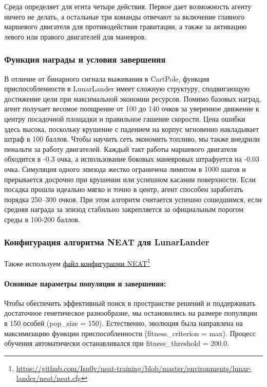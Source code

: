 Среда определяет для егнта четыре действия. Первое дает возможность агенту ничего не делать, а остальные три команды отвечают за включение главного маршевого двигателя для противодействия гравитации, а также за активацию левого или правого двигателей для маневров.

\subsubsection{Функция награды и условия завершения}

В отличие от бинарного сигнала выживания в CartPole, функция приспособленности в LunarLander имеет сложную структуру, сподвигающую достижение цели при максимальной экономии ресурсов. Помимо базовых наград, агент получает весомое поощрение от 100 до 140 очков за уверенное движение к центру посадочной площадки и правильное гашение скорости. Цена ошибки здесь высока, поскольку крушение с падением на корпус мгновенно накладывает штраф в 100 баллов. Чтобы научить сеть экономить топливо, мы также внедрили пенальти за работу двигателей. Каждый такт работы маршевого двигателя обходится в -0.3 очка, а использование боковых маневровых штрафуется на -0.03 очка.  Симуляция одного эпизода жестко ограничена лимитом в 1000 шагов и прерывается досрочно при крушении или успешном касании поверхности. Если посадка прошла идеально мягко и точно в центр, агент способен заработать порядка 250–300 очков. При этом алгоритм считается успешно сошедшимся, если средняя награда за эпизод стабильно закрепляется за официальным порогом среды в 100-200 баллов. 


\subsubsection{Конфигурация алгоритма NEAT для LunarLander}

Также используем \href{https://github.com/Isn0v/neat-training/blob/master/environments/lunar-lander/neat/neat.cfg}{файл конфигурации NEAT}\footnote{\url{https://github.com/Isn0v/neat-training/blob/master/environments/lunar-lander/neat/neat.cfg}}


\paragraph{Основные параметры популяции и завершения:}

Чтобы обеспечить эффективный поиск в пространстве решений и поддерживать достаточное генетическое разнообразие, мы остановились на размере популяции в 150 особей (pop\_size = 150). Естественно, эволюция была направлена на максимизацию функции приспособленности (fitness\_criterion = max). Процесс обучения автоматически останавливался при fitness\_threshold = 200.0.

